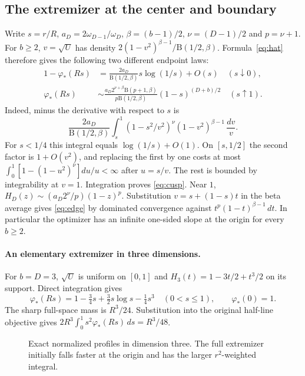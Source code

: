 \documentclass[11pt,a4paper]{article}
\numberwithin{equation}{section}
\newcommand{\B}{\mathrm B}\newcommand{\supp}{\operatorname{supp}}\newcommand{\vol}{\operatorname{vol}}
\begin{document}
\subsection{The extremizer at the center and boundary}
Write $s=r/R$, $a_D=2\omega_{D-1}/\omega_D$, $\beta=(b-1)/2$, $\nu=(D-1)/2$ and $p=\nu+1$. For $b\ge2$, $v=\sqrt U$ has density $2(1-v^2)^{\beta-1}/\B(1/2,\beta)$. Formula~\eqref{eq:hat} therefore gives the following two different endpoint laws:
\begin{align}
 1-\varphi_*(Rs)&=\frac{2a_D}{\B(1/2,\beta)}s\log(1/s)+O(s) \quad(s\downarrow0),\label{eq:cusp}\\
 \varphi_*(Rs)&\sim \frac{a_D 2^{\nu+\beta}\B(p+1,\beta)}{p\B(1/2,\beta)}(1-s)^{(D+b)/2}\quad(s\uparrow1).
 \label{eq:edge}
\end{align}
Indeed, minus the derivative with respect to $s$ is
\[
 \frac{2a_D}{\B(1/2,\beta)}\int_s^1 (1-s^2/v^2)^\nu(1-v^2)^{\beta-1}\,\frac{dv}{v} .
\]
For $s<1/4$ this integral equals $\log(1/s)+O(1)$. On $[s,1/2]$ the second factor is $1+O(v^2)$, and replacing the first by one costs at most $\int_0^1[1-(1-u^2)^\nu]du/u<\infty$ after $u=s/v$. The rest is bounded by integrability at $v=1$. Integration proves \eqref{eq:cusp}. Near $1$, $H_D(z)\sim (a_D2^\nu/p)(1-z)^p$. Substitution $v=s+(1-s)t$ in the beta average gives \eqref{eq:edge} by dominated convergence against $t^p(1-t)^{\beta-1}\,dt$. In particular the optimizer has an infinite one-sided slope at the origin for every $b\ge2$.

\paragraph{An elementary extremizer in three dimensions.} For $b=D=3$, $\sqrt U$ is uniform on $[0,1]$ and $H_3(t)=1-3t/2+t^3/2$ on its support. Direct integration gives
\begin{equation}\label{eq:three}
 \varphi_*(Rs)=1-\tfrac34s+\tfrac32s\log s-\tfrac14s^3\quad (0<s\le1),\qquad \varphi_*(0)=1.
\end{equation}
The sharp full-space mass is $R^3/24$. Substitution into the original half-line objective gives $2R^3\int_0^1s^2\varphi_*(Rs)\,ds=R^3/48$.
\begin{figure}[ht]
\centering
{}
\caption{Exact normalized profiles in dimension three. The full extremizer initially falls faster at the origin and has the larger $r^2$-weighted integral.}
\end{figure}
\end{document}
